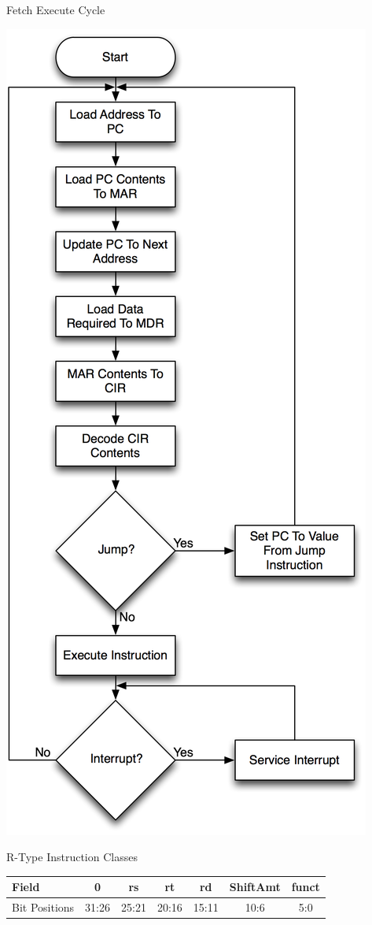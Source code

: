 \documentclass[landscape,fontscale=1,margin=0.2cm,paperwidth=60truecm, paperheight=34truecm,debug]{baposter}
\begin{document}
\begin{poster}
\begin{posterbox}[column=0,below=auto,textborder=rounded]{Fetch Execute Cycle}
\begin{center}
\includegraphics[scale=0.5]{fetchExCycle.png}
\end{center}
\end{posterbox}
\begin{posterbox}[column=1]{R-Type Instruction Classes}
\begin{center}
\begin{tabular}{|l |c|c|c|c|c|c|}
\hline
Field & 0 & rs & rt & rd & ShiftAmt & funct\\\hline
Bit Positions &31:26&25:21&20:16&15:11&10:6&5:0\\\hline
\end{tabular}
\end{center}
\end{posterbox}


\end{poster}
\end{document}
